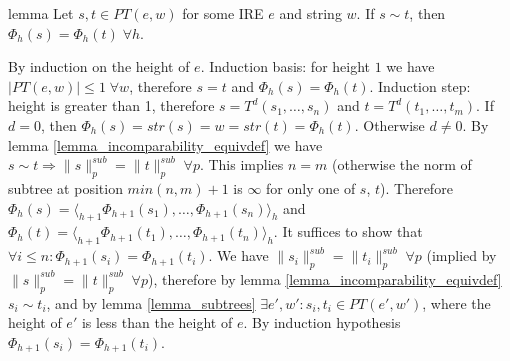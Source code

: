 \documentclass[AMA,STIX1COL]{WileyNJD-v2}
\newcommand{\Xl}{\langle}
\newcommand{\Xr}{\rangle}
\newcommand{\PT}{PT}
\newcommand{\snorm}[2]{\|{#1}\|^{sub}_{#2}}
\begin{document}
\begin{theoremEnd}{lemma}
    \label{lemma_pe_equiv}
    Let $s, t \in \PT(e, w)$ for some IRE $e$ and string $w$.
    If $s \sim t$, then $\Phi_{h}(s) = \Phi_{h}(t) \; \forall h$.
\end{theoremEnd}
\begin{proofEnd}
    By induction on the height of $e$.
    Induction basis: for height $1$ we have
    $| \PT(e, w) | \leq 1 \; \forall w$,
    therefore $s = t$ and $\Phi_{h}(s) = \Phi_{h}(t)$.
    Induction step:
    height is greater than 1, therefore
    $s = T^{d} (s_1, \dots, s_n)$ and
    $t = T^{d} (t_1, \dots, t_m)$.
    If $d = 0$, then $\Phi_{h}(s) = str(s) = w = str(t) = \Phi_{h}(t)$.
    Otherwise $d \neq 0$.
    By lemma \ref{lemma_incomparability_equivdef} we have $s \sim t \Rightarrow \snorm{s}{p} = \snorm{t}{p} \;\forall p$.
    This implies $n = m$ (otherwise the norm of subtree at position $min(n,m)+1$ is $\infty$ for only one of $s$, $t$).
    Therefore
    $\Phi_{h}(s) = \Xl_{h+1} \Phi_{h+1}(s_1), \dots, \Phi_{h+1}(s_n) \Xr_h$ and
    $\Phi_{h}(t) = \Xl_{h+1} \Phi_{h+1}(t_1), \dots, \Phi_{h+1}(t_n) \Xr_h$.
    It suffices to show that $\forall i \leq n: \Phi_{h+1}(s_i) = \Phi_{h+1}(t_i)$.
    We have $\snorm{s_i}{p} = \snorm{t_i}{p} \;\forall p$ (implied by $\snorm{s}{p} = \snorm{t}{p} \;\forall p$),
    therefore by lemma \ref{lemma_incomparability_equivdef} $s_i \sim t_i$,
    and by lemma \ref{lemma_subtrees} $\exists e', w': s_i, t_i \in \PT(e', w')$,
    where the height of $e'$ is less than the height of $e$.
    By induction hypothesis $\Phi_{h+1}(s_i) = \Phi_{h+1}(t_i)$.
\end{proofEnd}
\end{document}
